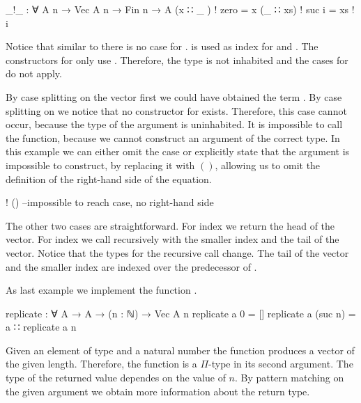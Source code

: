 \begin{AgdaAlign}
\begin{code}
_!_ : ∀ {A n} → Vec A n → Fin n → A
(x  ∷ _ )  ! zero   = x
(_  ∷ xs)  ! suc i  = xs ! i
\end{code}
Notice that similar to  there is no case for
\AgdaInductiveConstructor{[]}.
 is used as index for
\AgdaSpace{} and .
The constructors for  only use .
Therefore, the type
\AgdaSpace{}
is not inhabited and the cases for \AgdaInductiveConstructor{[]} do not apply.

By case splitting on the vector first we could have obtained the term
\AgdaInductiveConstructor{[]}\AgdaSpace{}\AgdaFunction{!}\AgdaSpace{}.
By case splitting on  we notice that no constructor for
 exists.
Therefore, this case cannot occur, because the type of the argument is
uninhabited.
It is impossible to call the function, because we cannot construct an argument of
the correct type.
In this example we can either omit the case or explicitly state that the
argument is impossible to construct, by replacing it with $()$, allowing us to
omit the definition of the right-hand side of the equation.

\begin{code}
[]         ! () --impossible to reach case, no right-hand side
\end{code}
\end{AgdaAlign}
The other two cases are straightforward.
For index  we return the head of the vector.
For index \AgdaSpace{} we call
\AgdaFunction{\_!\_} recursively with the smaller index and the tail of the
vector.
Notice that the types for the recursive call change.
The tail of the vector  and the smaller index 
are indexed over the predecessor of .

As last example we implement the function .
\begin{code}
replicate : ∀ {A} → A → (n : ℕ) → Vec A n
replicate a 0        = []
replicate a (suc n)  = a ∷ replicate a n
\end{code}
Given an element of type  and a natural number 
the function produces a vector of the given length.
Therefore, the function is a $\Pi$-type in its second argument.
The type of the returned value dependes on the value of $n$.
By pattern matching on the given argument we obtain more information about the
return type.

